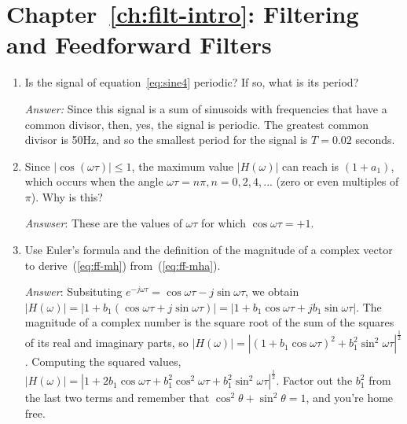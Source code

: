 \section{Chapter~\ref{ch:filt-intro}: Filtering and Feedforward Filters}
\label{sc:ch3ex}

\begin{enumerate}

\item Is the signal of equation~\ref{eq:sine4} periodic? If so, what
  is its period?\label{it:ch3ex0}

  \textit{Answer:} Since this signal is a sum of sinusoids with
  frequencies that have a common divisor, then, yes, the signal is
  periodic. The greatest common divisor is 50Hz, and so the smallest
  period for the signal is $T=0.02$ seconds.

\item Since $|\cos(\omega\tau)|\leq 1$, the maximum value
  $|H(\omega)|$ can reach is $(1+a_1)$, which occurs when the angle
  $\omega\tau=n\pi, n=0,2,4,...$ (zero or even multiples of
  $\pi$). Why is this?\label{it:ch3ex1}

  \textit{Answser}: These are the values of $\omega\tau$ for which
  $\cos\omega\tau=+1$.

\item Use Euler's formula and the definition of the magnitude of a
  complex vector to derive~(\ref{eq:ff-mh})
  from~(\ref{eq:ff-mha}).\label{it:ch3ex2}

  \textit{Answer}: Subsituting $e^{-j\omega \tau} = \cos\omega\tau -
  j\sin\omega\tau$, we obtain $|H(\omega)| = |1+b_1 (\cos\omega\tau +
  j\sin\omega\tau)| = |1+b_1 \cos\omega\tau + j
  b_1\sin\omega\tau|$. The magnitude of a complex number is the square
  root of the sum of the squares of its real and imaginary parts, so
  $|H(\omega)| = |(1+b_1 \cos\omega\tau)^2 +
  b_1^2\sin^2\omega\tau|^\frac{1}{2}$. Computing the squared values,
  $|H(\omega)| = |1 + 2b_1\cos\omega\tau + b_1^2\cos^2\omega\tau +
  b_1^2\sin^2\omega\tau|^{\frac{1}{2}}$. Factor out the $b_1^2$ from
  the last two terms and remember that $\cos^2\theta + \sin^2\theta =
  1$, and you're home free.



\end{enumerate}
